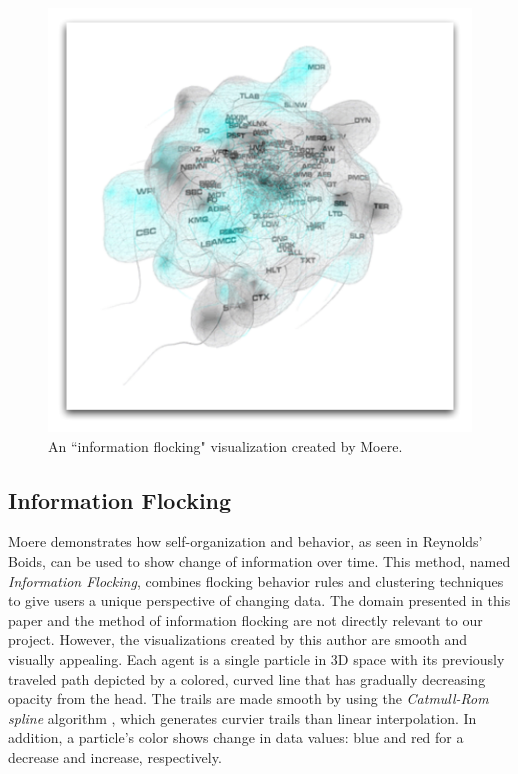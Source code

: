 \documentclass{vgtc}
\begin{document}
\begin{figure}
\centering
\includegraphics[scale=.5]{images/blob.pdf}
\caption{An ``information flocking" visualization created by Moere\cite{1382896}.}
\label{Blob}
\end{figure}

\subsection{Information Flocking}
Moere demonstrates how self-organization and behavior, as seen in Reynolds' Boids, can be used to show change of information over time\cite{1382896}. This method, named {\em Information Flocking}, combines flocking behavior rules
and clustering techniques to give users a unique perspective of changing data.
The domain presented in this paper and the method of information flocking are not directly relevant to our project.
However, the visualizations created by this author are smooth and visually appealing.
Each agent is a single particle in 3D space with its previously traveled path depicted by a colored,
curved line that has gradually decreasing opacity from the head.
The trails are made smooth by using the {\em Catmull-Rom spline} algorithm \cite{378511},
which generates curvier trails than linear interpolation.
In addition, a particle's color shows change in data values: blue and red for a decrease and increase, respectively.
\end{document}
